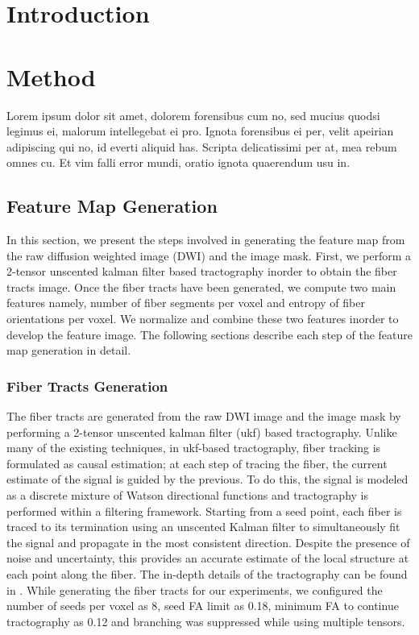 \documentclass{llncs}
\begin{document}



\section{Introduction}

\section{Method}
Lorem ipsum dolor sit amet, dolorem forensibus cum no, sed mucius quodsi legimus ei, malorum intellegebat ei pro. 
Ignota forensibus ei per, velit apeirian adipiscing qui no, id everti aliquid has. Scripta delicatissimi per at, 
mea rebum omnes cu. Et vim falli error mundi, oratio ignota quaerendum usu in. 

%
\subsection{Feature Map Generation}
%
In this section, we present the steps involved in generating the feature
map from the raw diffusion weighted image (DWI) and the image mask. First,
we perform a 2-tensor unscented kalman filter based tractography \cite{malc:mic} inorder 
to obtain the fiber tracts image. Once the fiber tracts have been generated, 
we compute two main features namely, number of fiber segments per voxel and 
entropy of fiber orientations per voxel.  We normalize and combine these two features 
inorder to develop the feature image. The following sections describe each step of 
the feature map generation in detail.

%
\subsubsection{Fiber Tracts Generation}
%
The fiber tracts are generated from the raw DWI image and the image mask by performing
a 2-tensor unscented kalman filter (ukf) based tractography. Unlike many of the existing 
techniques, in ukf-based tractography, fiber tracking is formulated as causal estimation; 
at each step of tracing the fiber, the current estimate of the signal is guided by the
previous. To do this, the signal is modeled as a discrete mixture of Watson directional
functions and tractography is performed within a filtering framework. Starting from
a seed point, each fiber is traced to its termination using an unscented Kalman filter 
to simultaneously fit the signal and propagate in the most consistent direction. Despite the 
presence of noise and uncertainty, this provides an accurate estimate of the local structure 
at each point along the fiber. The in-depth details of the tractography can be found in \cite{malc:mic}.
While generating the fiber tracts for our experiments, we configured the number of seeds per 
voxel as 8, seed FA limit as 0.18, minimum FA to continue tractography as 0.12 and branching
was suppressed while using multiple tensors. 
\end{document}
